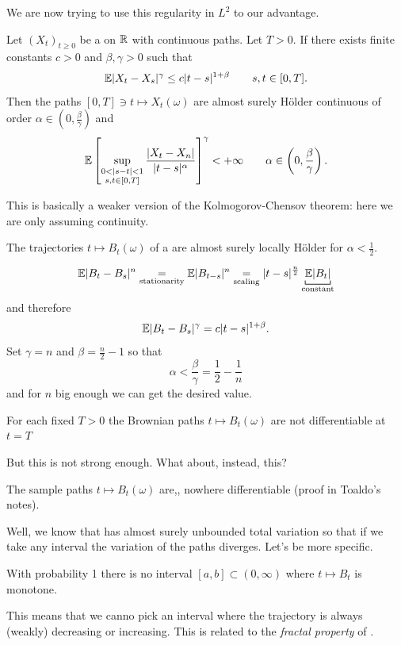 \documentclass[crop=false, class=article]{standalone}
\begin{document}
We are now trying to use this regularity in $L^{2}$ to our advantage.
\begin{theorem}
	Let ${(X_{t})}_{t\geq0}$ be a \rp{} on $\mathbb{R}$ with continuous paths. Let $T>0$. If there exists finite constants $c>0$ and $\beta,\gamma>0$ such that
	\begin{equation*}
		\mathbb{E}|X_{t}-X_{s}|^{\gamma}\leq c|t-s|^{1+\beta}\qquad s,t\in[0,T].
	\end{equation*}
	Then the paths $[0,T]\ni t\mapsto X_{t}(\omega)$ are almost surely Hölder continuous of order $\alpha\in(0,\frac{\beta}{\gamma})$ and
	\begin{equation*}
		\ev\left[\sup_{\substack{0<|s-t|<1 \\ s,t\in[0,T]}}\frac{|X_{t}-X_{n}|}{|t-s|^{\alpha}} \right]^{\gamma}<+\infty\qquad\alpha\in\left(0,\frac{\beta}{\gamma}\right).
	\end{equation*}
\end{theorem} 
This is basically a weaker version of the Kolmogorov-Chensov theorem: here we are only assuming continuity.
\begin{corollary}
	The trajectories $t\mapsto B_{t}(\omega)$ of a \brm{} are almost surely locally Hölder for $\alpha<\frac{1}{2}$.
\end{corollary}
\begin{fancyproof}
	\begin{equation*}
		\ev|B_{t}-B_{s}|^{n}\underset{\text{stationarity}}{=}\ev|B_{t-s}|^{n}\underset{\text{scaling}}{=}|t-s|^{\frac{n}{2}}\underbracket[0.6pt]{\ev|B_{t}|}_{\text{constant}}
	\end{equation*}
	and therefore
	\begin{equation*}
		\mathbb{E}|B_{t}-B_{s}|^{\gamma}=c|t-s|^{1+\beta}.
	\end{equation*}
	Set $\gamma=n$ and $\beta=\frac{n}{2}-1$ so that
	\begin{equation*}
		\alpha<\frac{\beta}{\gamma}=\frac{1}{2}-\frac{1}{n}
	\end{equation*}
	and for $n$ big enough we can get the desired value.
\end{fancyproof}
\begin{proposition}
	For each fixed $T>0$ the Brownian paths $t\mapsto B_{t}(\omega)$ are not differentiable at $t=T$ \as{}
\end{proposition}
But this is not strong enough. What about, instead, this?
\begin{proposition}
	The sample paths $t\mapsto B_{t}(\omega)$ are,\as, nowhere differentiable (proof in Toaldo's notes).
\end{proposition}
Well, we know that  \brm{} has almost surely unbounded total variation so that if we take any interval the variation of the paths diverges. Let's be more specific.
\begin{proposition}
	With probability 1 there is no interval $[a,b]\subset(0,\infty)$ where $t\mapsto B_{t}$ is monotone.
\end{proposition}
This means that we canno pick an interval where the trajectory is always (weakly) decreasing or increasing. This is related to the \textit{fractal property} of \brm.\\
\end{document}

